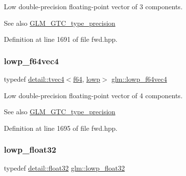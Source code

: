 Low double-\/precision floating-\/point vector of 3 components. \begin{DoxySeeAlso}{See also}
\hyperlink{group__gtc__type__precision}{G\+L\+M\+\_\+\+G\+T\+C\+\_\+type\+\_\+precision} 
\end{DoxySeeAlso}


Definition at line 1691 of file fwd.\+hpp.

\mbox{\label{group__gtc__type__precision_gaf99497c42a2d011fecab7f3f2312213d}} 
\subsubsection{\texorpdfstring{lowp\+\_\+f64vec4}{lowp\_f64vec4}}
{\footnotesize\ttfamily typedef \hyperlink{structglm_1_1detail_1_1tvec4}{detail\+::tvec4}$<$\hyperlink{group__gtc__type__precision_ga2bba392e555124b36cde6abba349bab3}{f64}, \hyperlink{namespaceglm_a0f04f086094c747d227af4425893f545ae161af3fc695e696ce3bf69f7332bc2d}{lowp}$>$ \hyperlink{group__gtc__type__precision_gaf99497c42a2d011fecab7f3f2312213d}{glm\+::lowp\+\_\+f64vec4}}

Low double-\/precision floating-\/point vector of 4 components. \begin{DoxySeeAlso}{See also}
\hyperlink{group__gtc__type__precision}{G\+L\+M\+\_\+\+G\+T\+C\+\_\+type\+\_\+precision} 
\end{DoxySeeAlso}


Definition at line 1695 of file fwd.\+hpp.

\mbox{\label{group__gtc__type__precision_ga92be8087f3c84504f3a44af1a9efc51e}} 
\subsubsection{\texorpdfstring{lowp\+\_\+float32}{lowp\_float32}}
{\footnotesize\ttfamily typedef \hyperlink{namespaceglm_1_1detail_ad60558c5c304624de0b54c51b5857737}{detail\+::float32} \hyperlink{group__gtc__type__precision_ga92be8087f3c84504f3a44af1a9efc51e}{glm\+::lowp\+\_\+float32}}

